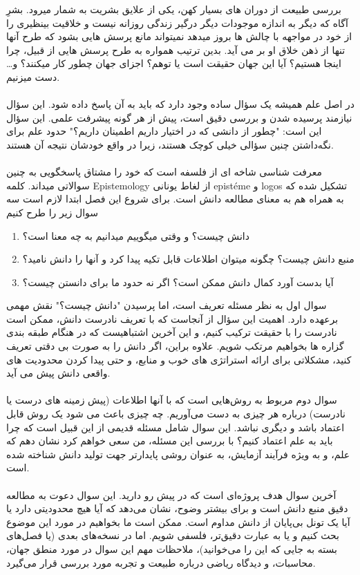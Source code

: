 بررسی طبیعت از دوران های بسیار کهن، یکی از علایق بشریت به شمار میرود. بشرِ آگاه که دیگر به اندازه موجودات دیگر درگیر زندگی روزانه نیست و خلاقیت بینظیری را از خود در مواجهه با چالش ها بروز میدهد نمیتواند مانع پرسش هایی بشود که طرح آنها تنها از ذهن خلاق او بر می آید. بدین ترتیب همواره به طرح پرسش هایی از قبیل، چرا اینجا هستیم؟ آیا این جهان حقیقت است یا توهم؟ اجزای جهان چطور کار میکنند؟ و… دست میزنیم. 
\\
\\
در اصل علم همیشه یک سؤال ساده وجود دارد که باید به آن پاسخ داده شود. این سؤال نیازمند پرسیده شدن و بررسی دقیق است، پیش از هر گونه پیشرفت علمی. این سؤال این است: "چطور از دانشی که در اختیار داریم اطمینان داریم؟" حدود علم برای نگه‌داشتن چنین سؤالی خیلی کوچک هستند، زیرا در واقع خودشان نتیجه آن هستند.
\\
\\
معرفت شناسی شاخه ای از فلسفه است که خود را مشتاق پاسخگویی به چنین سوالاتی میداند. کلمه Epistemology از لغاط یونانی epistéme و logos تشکیل شده که به همراه هم به معنای مطالعه دانش است. برای شروع این فصل ابتدا لازم است سه سوال زیر را طرح کنیم
\begin{enumerate}
     \item دانش چیست؟ و وقتی میگوییم میدانیم به چه معنا است؟
     \item منبع دانش چیست؟ چگونه میتوان اطلاعات قابل تکیه پیدا کرد و آنها را دانش نامید؟
     \item آیا بدست آورد کمال دانش ممکن است؟ اگر نه حدود ما برای دانستن چیست؟
\end{enumerate}
سوال اول به نظر مسئله تعریف است، اما پرسیدن "دانش چیست؟" نقش مهمی برعهده دارد. اهمیت این سؤال از آنجاست که با تعریف نادرست دانش، ممکن است نادرست را با حقیقت ترکیب کنیم، و این آخرین اشتباهیست که در هنگام طبقه بندی گزاره ها بخواهیم مرتکب شویم. علاوه براین، اگر دانش را به صورت بی دقتی تعریف کنید، مشکلاتی برای ارائه استراتژی های خوب و منابع، و حتی پیدا کردن محدودیت های واقعی دانش پیش می آید.
\\
\\
سوال دوم مربوط به روش‌هایی است که با آنها اطلاعات (پیش زمینه های درست یا نادرست) درباره هر چیزی به دست می‌آوریم. چه چیزی باعث می شود یک روش قابل اعتماد باشد و دیگری نباشد. این سوال شامل مسئله قدیمی از این قبیل است که چرا باید به علم اعتماد کنیم؟ با بررسی این مسئله، من سعی خواهم کرد نشان دهم که علم، و به ویژه فرآیند آزمایش، به عنوان روشی پایدارتر جهت تولید دانش شناخته شده است.
\\
\\
آخرین سوال هدف پروژه‌ای است که در پیش رو دارید. این سوال دعوت به مطالعه دقیق منبع دانش است و برای بیشتر وضوح، نشان می‌دهد که آیا هیچ محدودیتی دارد یا آیا یک تونل بی‌پایان از دانش مداوم است. ممکن است ما بخواهیم در مورد این موضوع بحث کنیم و یا به عبارت دقیق‌تر، فلسفی شویم. اما در نسخه‌های بعدی (یا فصل‌های بسته به جایی که این را می‌خوانید)، ملاحظات مهم این سوال در مورد منطق جهان، محاسبات، و دیدگاه ریاضی درباره طبیعت و تجربه مورد بررسی قرار می‌گیرد.

